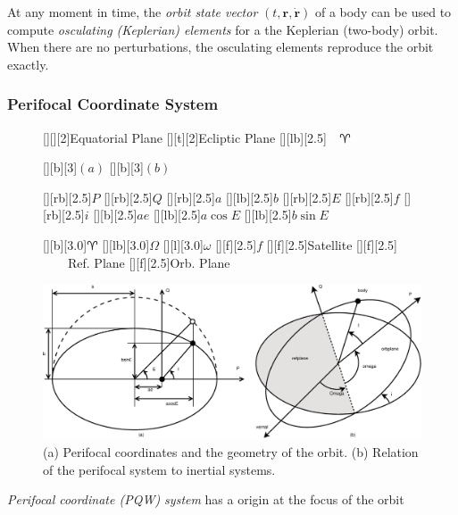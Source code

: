 \documentclass [12pt, a4paper] {article}
\newcommand{\vc}[1]
{
	\boldsymbol{#1}
}
\begin{document}
At any moment in time, the \emph{orbit state vector} $(t, \vc r, \dot{\vc r})$ 
of a body can be used to compute \emph{osculating (Keplerian) elements} for a 
the Keplerian (two-body) orbit. When there are no perturbations, the osculating 
elements reproduce the orbit exactly.


\subsubsection{Perifocal Coordinate System}
\begin {figure}
  \begin {center}
     [][][2]{Equatorial Plane}
     [][t][2]{Ecliptic Plane}
     [][lb][2.5]{$\quad\aries$}

     [][b][3]{$(a)$}
     [][b][3]{$(b)$}

     [][rb][2.5]{$P$}
     [][rb][2.5]{$Q$}
     [][rb][2.5]{$a$}
     [][lb][2.5]{$b$}
     [][rb][2.5]{$E$}
     [][rb][2.5]{$f$}
     [][rb][2.5]{$i$}
     [][b][2.5]{$ae$}
     [][lb][2.5]{$a\cos E$}
     [][lb][2.5]{$b\sin E$}

     [][b][3.0]{$\aries$}
     [][lb][3.0]{$\Omega$}
     [][l][3.0]{$\omega$}
     [][f][2.5]{$f$}
     [][f][2.5]{Satellite}
     [][f][2.5]{$\quad\quad$Ref. Plane}
     [][f][2.5]{Orb. Plane$\quad$}

     \includegraphics [angle=0, width=1.0\columnwidth] {figures/kepler.eps}
     \caption{\label{fig:perifocal}(a) Perifocal coordinates and the geometry of the 
     orbit. (b) Relation of the perifocal system to inertial systems.}
  \end {center}
\end {figure} 
\emph{Perifocal coordinate (PQW) system} has a origin at the focus of the orbit
\end{document}
